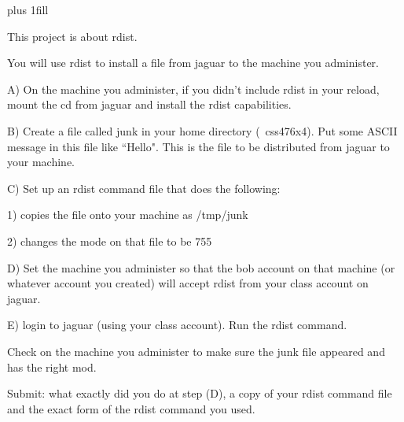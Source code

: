 
\rightskip=0pt plus 1fill

\parindent 0pt

This project is about rdist.

You will use rdist to install a file from {\ltt{}jaguar} to the machine 
you administer.

A) On the machine you administer, if you didn't include rdist in your reload,
mount the cd from {\ltt{}jaguar} and install the rdist capabilities.

B) Create a file called {\ltt{}junk} in your home directory ({\ltt{}~css476x4}).
Put some ASCII message in this file like ``Hello".
This is the file to be distributed from {\ltt{}jaguar} to your machine.

C) Set up an rdist command file that does the following:

1) copies the file onto your machine as {\ltt{}/tmp/junk}

2) changes the mode on that file to be {\ltt{}755}

D) Set the machine you administer so that the {\ltt{}bob} account on that
machine (or whatever account you created) will accept rdist from your
class account on {\ltt{}jaguar}.

E) login to {\ltt{}jaguar} (using your class account).
Run the rdist command.

Check on the machine you administer to make sure the junk file appeared
and has the right mod.

Submit: what exactly did you do at step (D),
a copy of your rdist command file and
the exact form of the rdist command you used.
\bye
